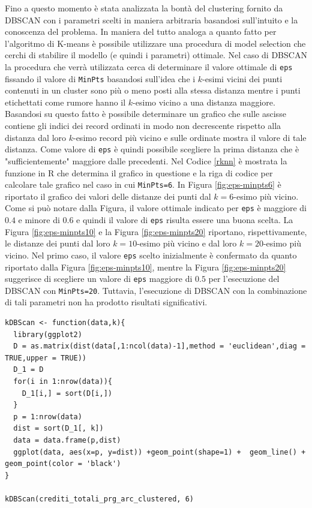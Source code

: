 \documentclass[12pt]{article}
\begin{document}
Fino a questo momento è stata analizzata la bontà del clustering fornito da DBSCAN con i parametri scelti in maniera arbitraria basandosi sull'intuito e la conoscenza del problema. In maniera del tutto analoga a quanto fatto per l'algoritmo di K-means è possibile utilizzare una procedura di model selection che cerchi di stabilire il modello (e quindi i parametri) ottimale. Nel caso di DBSCAN la procedura che verrà utilizzata cerca di determinare il valore ottimale di \texttt{eps} fissando il valore di \texttt{MinPts} basandosi sull'idea che i $k$-esimi vicini dei punti contenuti in un cluster sono più o meno posti alla stessa distanza mentre i punti etichettati come rumore hanno il $k$-esimo vicino a una distanza maggiore. Basandosi su questo fatto è possibile determinare un grafico che sulle ascisse contiene gli indici dei record ordinati in modo non decrescente rispetto alla distanza dal loro $k$-esimo record più vicino e sulle ordinate mostra il valore di tale distanza. Come valore di \texttt{eps} è quindi possibile scegliere la prima distanza che è "sufficientemente" maggiore dalle precedenti. Nel Codice \ref{rknn} è mostrata la funzione in R che determina il grafico in questione e la riga di codice per calcolare tale grafico nel caso in cui \texttt{MinPts=6}. In Figura \ref{fig:eps-minpts6} è riportato il grafico dei valori delle distanze dei punti dal $k=6$-esimo più vicino. Come si può notare dalla Figura, il valore ottimale indicato per \texttt{eps} è maggiore di $0.4$ e minore di $0.6$ e quindi il valore di \texttt{eps} risulta essere una buona scelta. La Figura \ref{fig:eps-minpts10} e la Figura \ref{fig:eps-minpts20} riportano, rispettivamente, le distanze dei punti dal loro $k=10$-esimo più vicino e dal loro $k=20$-esimo più vicino. Nel primo caso, il valore \texttt{eps} scelto inizialmente è confermato da quanto riportato dalla Figura \ref{fig:eps-minpts10}, mentre la Figura \ref{fig:eps-minpts20} suggerisce di scegliere un valore di \texttt{eps} maggiore di $0.5$ per l'esecuzione del DBSCAN con \texttt{MinPts=20}. Tuttavia, l'esecuzione di DBSCAN con la combinazione di tali parametri non ha prodotto risultati significativi.
\begin{minipage}{\linewidth}
\begin{lstlisting}[caption={Codice R per il calcolo del grafico della k-esima distanza da ogni punto del dataset.}, label={rknn}, captionpos=b, style = R]
kDBScan <- function(data,k){
  library(ggplot2)
  D = as.matrix(dist(data[,1:ncol(data)-1],method = 'euclidean',diag = TRUE,upper = TRUE))
  D_1 = D
  for(i in 1:nrow(data)){
    D_1[i,] = sort(D[i,])
  }
  p = 1:nrow(data)
  dist = sort(D_1[, k])
  data = data.frame(p,dist)
  ggplot(data, aes(x=p, y=dist)) +geom_point(shape=1) +  geom_line() + geom_point(color = 'black')
}

kDBScan(crediti_totali_prg_arc_clustered, 6)
\end{lstlisting}
\end{minipage}
\end{document}
